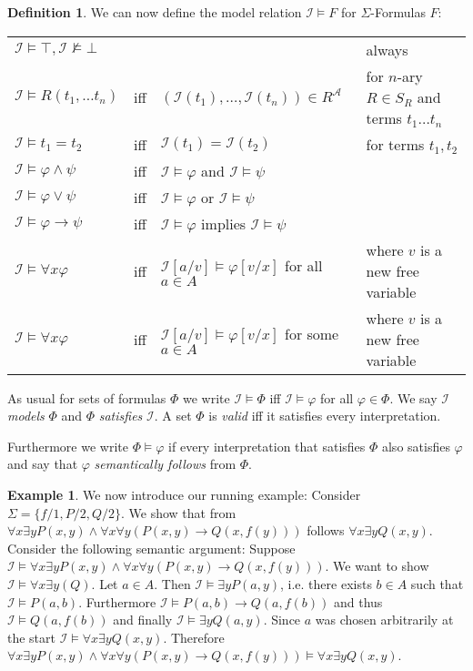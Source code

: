 \documentclass[onehalfspacing]{article}
\theoremstyle{definition}
\theoremstyle{definition}
\theoremstyle{definition}
\theoremstyle{definition}
\theoremstyle{definition}
\newtheorem{definition}[theorem]{Definition}
\theoremstyle{definition}
\newtheorem{example}[theorem]{Example}
\newcommand{\I}{\mathcal{I}}
\begin{document}
\begin{definition}We can now define the model relation $\I\models F$ for $\Sigma$-Formulas $F$:\\
	\begin{tabular}{lcll}
		$\I\models\top, \mathcal I\not\models\bot$ &&& always\\
		$\I\models R(t_1,\dots t_n)$ & iff & $(\I(t_1),\dots,\I(t_n))\in R^\mathcal A$ & for $n$-ary $R\in S_R$ and terms $t_1\dots t_n$\\
		$\I\models t_1 = t_2$ & iff & $\I(t_1)=\I(t_2)$ & for terms $t_1, t_2$\\
		$\I\models \varphi\wedge\psi$ & iff & $\I\models \varphi$ and $\I\models \psi$ & \\
		$\I\models \varphi\vee\psi$ & iff & $\I\models \varphi$ or $\I\models \psi$ & \\
		$\I\models \varphi\to\psi$ & iff & $\I\models \varphi$ implies $\I\models \psi$ & \\
		$\I\models \forall x\varphi$ & iff & $\I[a/v]\models\varphi[v/x]$ for all $a\in A$ & where $v$ is a new free variable\\
		$\I\models \forall x\varphi$ & iff & $\I[a/v]\models\varphi[v/x]$ for some $a\in A$ & where $v$ is a new free variable\\
		\end{tabular}
	As usual for sets of formulas $\Phi$ we write $\I\models\Phi$ iff $\I\models\varphi$ for all $\varphi\in\Phi$. We say $\I$ \textit{models} $\Phi$ and $\Phi$ \textit{satisfies} $\I$. A set $\Phi$ is \textit{valid} iff it satisfies every interpretation.
	
	Furthermore we write $\Phi\models\varphi$ if every interpretation that satisfies $\Phi$ also satisfies $\varphi$ and say that $\varphi$ \textit{semantically follows} from $\Phi$.
\end{definition}



\begin{example}We now introduce our running example: Consider $\Sigma = \{f/1, P/2, Q/2\}$. We show that from $\forall x \exists y P(x, y)\wedge\forall x \forall y(P(x, y)\to Q(x, f(y)))$ follows $\forall x\exists yQ(x, y)$. Consider the following semantic argument: Suppose $\mathcal{I}\models \forall x \exists y P(x, y)\wedge\forall x \forall y(P(x, y)\to Q(x, f(y)))$. We want to show $\I\models\forall x\exists y(Q)$. Let $a\in A$. Then $\mathcal{I}\models \exists yP(a, y)$, i.e. there exists $b\in A$ such that $\I\models P(a, b)$. Furthermore $\I\models P(a, b)\to Q(a, f(b))$ and thus $\I\models Q(a, f(b))$ and finally $\I\models \exists y Q(a, y)$. Since $a$ was chosen arbitrarily at the start $\I\models\forall x\exists yQ(x,y)$. Therefore $\forall x \exists y P(x, y)\wedge\forall x \forall y(P(x, y)\to Q(x, f(y)))\models\forall x\exists yQ(x, y)$.
\end{example}
\end{document}
